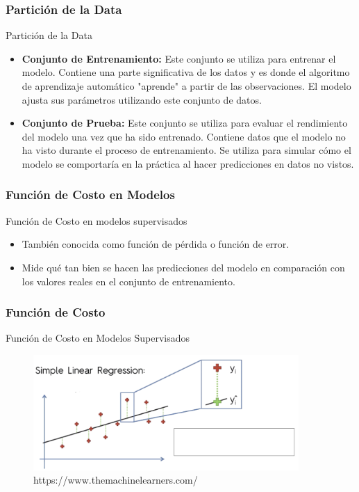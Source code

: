 \documentclass{beamer}
\begin{document}
	
	
\begin{frame}
	\frametitle{Partición de la Data}
			\begin{block}{Partición de la Data}	
	\begin{itemize}
	\item  \textbf{Conjunto de Entrenamiento:} 
	Este conjunto se utiliza para entrenar el modelo. Contiene una parte significativa de los datos y es donde el algoritmo de aprendizaje automático "aprende" a partir de las observaciones. El modelo ajusta sus parámetros utilizando este conjunto de datos.
	\item \textbf{ Conjunto de Prueba:} 
	Este conjunto se utiliza para evaluar el rendimiento del modelo una vez que ha sido entrenado. Contiene datos que el modelo no ha visto durante el proceso de entrenamiento. Se utiliza para simular cómo el modelo se comportaría en la práctica al hacer predicciones en datos no vistos.
		\end{itemize}
			\end{block}
\end{frame}

\begin{frame}
	\frametitle{Función de Costo en Modelos}
			\begin{block}{Función de Costo en modelos supervisados}	
	\begin{itemize}
		\item También conocida como función de pérdida o función de error.
		\item Mide qué tan bien se hacen las predicciones del modelo en comparación con los valores reales en el conjunto de entrenamiento.
	\end{itemize}
		\end{block}
\end{frame}

\begin{frame}
	\frametitle{Función de Costo}
	\begin{block}{Función de Costo en Modelos Supervisados}	
		\begin{figure}
	\includegraphics[width=0.9\textwidth]{funcion_coste}
	\caption{https://www.themachinelearners.com/}
\end{figure}
	\end{block}
\end{frame}
\end{document}
